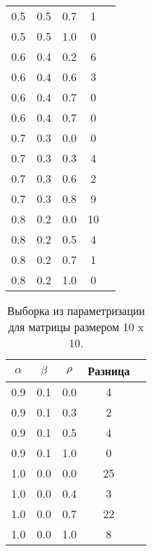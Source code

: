 \begin{table}[h!]
\begin{tabular}{|c|c|c|c|c|}
            0.5  & 0.5  & 0.7  & 1     \\
            0.5  & 0.5  & 1.0  & 0     \\
            \hline
            0.6  & 0.4  & 0.2  & 6     \\
            0.6  & 0.4  & 0.6  & 3     \\
            0.6  & 0.4  & 0.7  & 0     \\
            0.6  & 0.4  & 0.7  & 0     \\
            \hline
            0.7  & 0.3  & 0.0  & 0     \\
            0.7  & 0.3  & 0.3  & 4     \\
            0.7  & 0.3  & 0.6  & 2     \\
            0.7  & 0.3  & 0.8  & 9     \\
            \hline
            0.8  & 0.2  & 0.0  & 10    \\
            0.8  & 0.2  & 0.5  & 4     \\
            0.8  & 0.2  & 0.7  & 1     \\
            0.8  & 0.2  & 1.0  & 0     \\
            \hline
        \end{tabular}
    \end{table}

    \begin{table}[h!]
        \caption{Выборка из параметризации для матрицы размером 10 x 10.}
        \label{table:test:params}
        \centering
        \begin{tabular}{|c|c|c|c|c|}
            \hline
            $\alpha$        & $\beta$      & $\rho$  & Разница \\
            \hline
            0.9  & 0.1  & 0.0 & 4     \\
            0.9  & 0.1  & 0.3 & 2     \\
            0.9  & 0.1  & 0.5 & 4     \\
            0.9  & 0.1  & 1.0 & 0     \\
            \hline
            1.0  & 0.0  & 0.0 & 25     \\
            1.0  & 0.0  & 0.4 & 3      \\
            1.0  & 0.0  & 0.7 & 22     \\
            1.0  & 0.0  & 1.0 & 8      \\
            \hline
        \end{tabular}
    \end{table}

